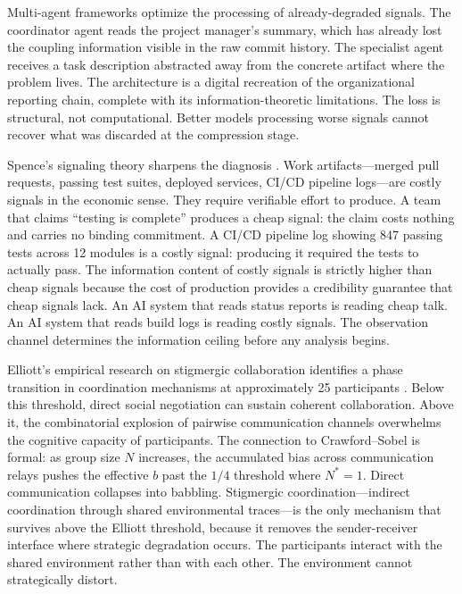 \documentclass[11pt,a4paper]{article}
\begin{document}
Multi-agent frameworks optimize the processing of already-degraded signals. The coordinator agent reads the project manager's summary, which has already lost the coupling information visible in the raw commit history. The specialist agent receives a task description abstracted away from the concrete artifact where the problem lives. The architecture is a digital recreation of the organizational reporting chain, complete with its information-theoretic limitations. The loss is structural, not computational. Better models processing worse signals cannot recover what was discarded at the compression stage.

Spence's signaling theory sharpens the diagnosis \citep{spence1973}. Work artifacts---merged pull requests, passing test suites, deployed services, CI/CD pipeline logs---are costly signals in the economic sense. They require verifiable effort to produce. A team that claims ``testing is complete'' produces a cheap signal: the claim costs nothing and carries no binding commitment. A CI/CD pipeline log showing 847 passing tests across 12 modules is a costly signal: producing it required the tests to actually pass. The information content of costly signals is strictly higher than cheap signals because the cost of production provides a credibility guarantee that cheap signals lack. An AI system that reads status reports is reading cheap talk. An AI system that reads build logs is reading costly signals. The observation channel determines the information ceiling before any analysis begins.

Elliott's empirical research on stigmergic collaboration identifies a phase transition in coordination mechanisms at approximately 25 participants \citep{elliott2007}. Below this threshold, direct social negotiation can sustain coherent collaboration. Above it, the combinatorial explosion of pairwise communication channels overwhelms the cognitive capacity of participants. The connection to Crawford--Sobel is formal: as group size $N$ increases, the accumulated bias across communication relays pushes the effective $b$ past the $1/4$ threshold where $N^* = 1$. Direct communication collapses into babbling. Stigmergic coordination---indirect coordination through shared environmental traces---is the only mechanism that survives above the Elliott threshold, because it removes the sender-receiver interface where strategic degradation occurs. The participants interact with the shared environment rather than with each other. The environment cannot strategically distort.
\end{document}
